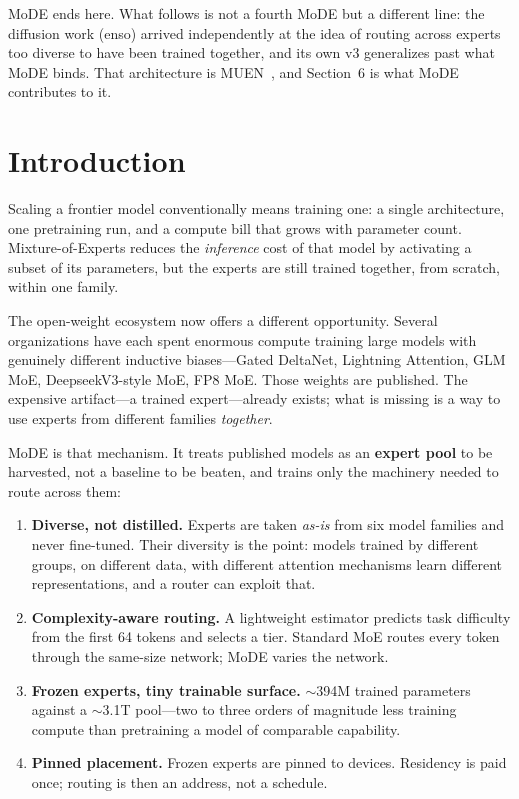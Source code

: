 \documentclass[11pt,a4paper]{article}
\begin{document}
MoDE ends here. What follows is not a fourth MoDE but a different line: the diffusion
work (enso) arrived independently at the idea of routing across experts too diverse to have been
trained together, and its own v3 generalizes past what MoDE binds. That architecture is
MUEN~\cite{muen}, and Section~6 is what MoDE contributes to it.


\section{Introduction}

Scaling a frontier model conventionally means training one: a single architecture, one
pretraining run, and a compute bill that grows with parameter count. Mixture-of-Experts
reduces the \emph{inference} cost of that model by activating a subset of its parameters,
but the experts are still trained together, from scratch, within one family.

The open-weight ecosystem now offers a different opportunity. Several organizations have
each spent enormous compute training large models with genuinely different inductive
biases---Gated DeltaNet, Lightning Attention, GLM MoE, DeepseekV3-style MoE, FP8 MoE.
Those weights are published. The expensive artifact---a trained expert---already exists;
what is missing is a way to use experts from different families \emph{together}.

MoDE is that mechanism. It treats published models as an \textbf{expert pool} to be
harvested, not a baseline to be beaten, and trains only the machinery needed to route
across them:

\begin{enumerate}
  \item \textbf{Diverse, not distilled.} Experts are taken \emph{as-is} from six model
        families and never fine-tuned. Their diversity is the point: models trained by
        different groups, on different data, with different attention mechanisms learn
        different representations, and a router can exploit that.
  \item \textbf{Complexity-aware routing.} A lightweight estimator predicts task
        difficulty from the first 64 tokens and selects a tier. Standard MoE routes every
        token through the same-size network; MoDE varies the network.
  \item \textbf{Frozen experts, tiny trainable surface.} $\sim$394M trained parameters
        against a $\sim$3.1T pool---two to three orders of magnitude less training compute
        than pretraining a model of comparable capability.
  \item \textbf{Pinned placement.} Frozen experts are pinned to devices. Residency is
        paid once; routing is then an address, not a schedule.
\end{enumerate}
\end{document}
